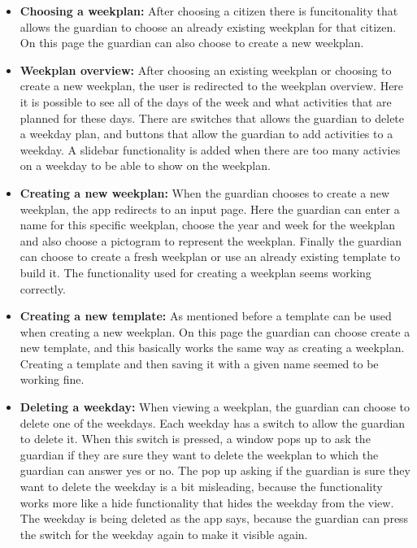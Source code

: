 \begin{itemize}
    \item \textbf{Choosing a weekplan:} After choosing a citizen there is funcitonality that allows the guardian to choose an already existing weekplan for that citizen. 
    On this page the guardian can also choose to create a new weekplan.
    \\
    \item \textbf{Weekplan overview:} After choosing an existing weekplan or choosing to create a new weekplan, the user is redirected to the weekplan overview. 
    Here it is possible to see all of the days of the week and what activities that are planned for these days. There are switches that allows the guardian to delete a weekday plan, and buttons that allow the guardian to add activities to a weekday. 
    A slidebar functionality is added when there are too many activies on a weekday to be able to show on the weekplan.
    \\
    \item \textbf{Creating a new weekplan:} When the guardian chooses to create a new weekplan, the app redirects to an input page. 
    Here the guardian can enter a name for this specific weekplan, choose the year and week for the weekplan and also choose a pictogram to represent the weekplan. 
    Finally the guardian can choose to create a fresh weekplan or use an already existing template to build it. The functionality used for creating a weekplan seems working correctly.
    \\
    \item \textbf{Creating a new template:} As mentioned before a template can be used when creating a new weekplan. 
    On this page the guardian can choose create a new template, and this basically works the same way as creating a weekplan. 
    Creating a template and then saving it with a given name seemed to be working fine.
    \\
    \item \textbf{Deleting a weekday:} When viewing a weekplan, the guardian can choose to delete one of the weekdays. Each weekday has a switch to allow the guardian to delete it.
    When this switch is pressed, a window pops up to ask the guardian if they are sure they want to delete the weekplan to which the guardian can answer yes or no. 
    The pop up asking if the guardian is sure they want to delete the weekday is a bit misleading, because the functionality works more like a hide functionality that hides the weekday from the view. 
    The weekday is being deleted as the app says, because the guardian can press the switch for the weekday again to make it visible again.

\end{itemize}
